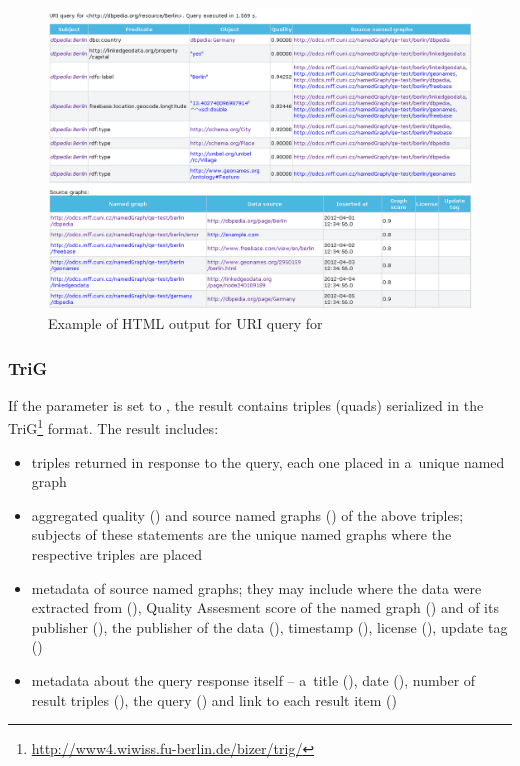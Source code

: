 {\begin{figure}[htb]
    \centering
    \includegraphics[width=\textwidth]{images/uri-query-screenshot.png}
    \caption{Example of HTML output for URI query for }
	\label{fig:uriQuery}
\end{figure}

\subsubsection{TriG}
\label{sec:URIKWTrig}

If the  parameter is set to , the result contains triples (quads) serialized in the TriG\footnote{\url{http://www4.wiwiss.fu-berlin.de/bizer/trig/}} format. The result includes:

\begin{itemize}
	\item triples returned in response to the query, each one placed in a~unique named graph
  \item aggregated quality () and source named graphs () of the above triples; subjects of these statements are the unique named graphs where the respective triples are placed
  \item  metadata of source named graphs; they may include where the data were extracted from (), Quality Assesment score of the named graph () and of its publisher (), the publisher of the data (), timestamp (), license (), update tag ()
  \item  metadata about the query response itself -- a~title (), date (), number of result triples (), the query () and link to each result item ()
\end{itemize}

}
